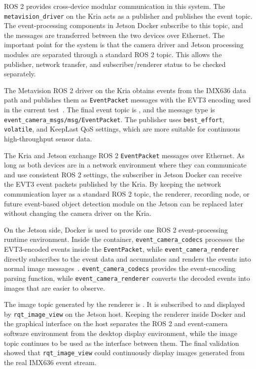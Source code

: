ROS 2 provides cross-device modular communication in this system. The \texttt{metavision\_driver} on the Kria acts as a publisher and publishes the event topic. The event-processing components in Jetson Docker subscribe to this topic, and the messages are transferred between the two devices over Ethernet. The important point for the system is that the camera driver and Jetson processing modules are separated through a standard ROS 2 topic. This allows the publisher, network transfer, and subscriber/renderer status to be checked separately.

The Metavision ROS 2 driver on the Kria obtains events from the IMX636 data path and publishes them as \texttt{EventPacket} messages with the EVT3 encoding used in the current test~\parencite{metavisionDriver}. The final event topic is , and the message type is \texttt{event\_camera\_msgs/msg/EventPacket}. The publisher uses \texttt{best\_effort}, \texttt{volatile}, and KeepLast QoS settings, which are more suitable for continuous high-throughput sensor data.

The Kria and Jetson exchange ROS 2 \texttt{EventPacket} messages over Ethernet. As long as both devices are in a network environment where they can communicate and use consistent ROS 2 settings, the subscriber in Jetson Docker can receive the EVT3 event packets published by the Kria. By keeping the network communication layer as a standard ROS 2 topic, the renderer, recording node, or future event-based object detection module on the Jetson can be replaced later without changing the camera driver on the Kria.

On the Jetson side, Docker is used to provide one ROS 2 event-processing runtime environment. Inside the container, \texttt{event\_camera\_codecs} processes the EVT3-encoded events inside the \texttt{EventPacket}, while \texttt{event\_camera\_renderer} directly subscribes to the event data and accumulates and renders the events into normal image messages~\parencite{eventCameraRenderer}. \texttt{event\_camera\_codecs} provides the event-encoding parsing function, while \texttt{event\_camera\_renderer} converts the decoded events into images that are easier to observe.

The image topic generated by the renderer is . It is subscribed to and displayed by \texttt{rqt\_image\_view} on the Jetson host. Keeping the renderer inside Docker and the graphical interface on the host separates the ROS 2 and event-camera software environment from the desktop display environment, while the image topic continues to be used as the interface between them. The final validation showed that \texttt{rqt\_image\_view} could continuously display images generated from the real IMX636 event stream.
